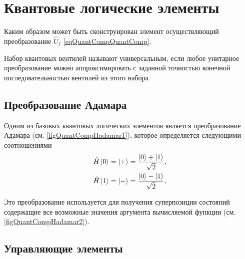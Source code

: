 \section{Квантовые логические элементы}
Каким образом может быть сконструирован элемент осуществляющий
преобразование $\hat{U}_f$ \eqref{eqQuantCompQuantComp}.

Набор квантовых вентилей называют универсальным, если любое унитарное
преобразование можно аппроксимировать с заданной точностью конечной
последовательностью вентилей из этого набора.

\subsection{Преобразование Адамара}

Одним из базовых квантовых логических элементов является
преобразование Адамара (см. \autoref{figQuantCompHadamar1}), которое
определяется следующими соотношениями
\begin{eqnarray}
\hat{H} \ket{0} = \ket{+} =  
\frac{\ket{0} + \ket{1} }{\sqrt{2}},
\nonumber \\
\hat{H} \ket{1} = \ket{-} = 
\frac{\ket{0} - \ket{1} }{\sqrt{2}},
\nonumber
\end{eqnarray}



Это преобразование используется для получения суперпозиции состояний
содержащие все возможные значения аргумента вычисляемой функции
(см. \autoref{figQuantCompHadamar2}). 



\subsection{Управляющие элементы}






 


